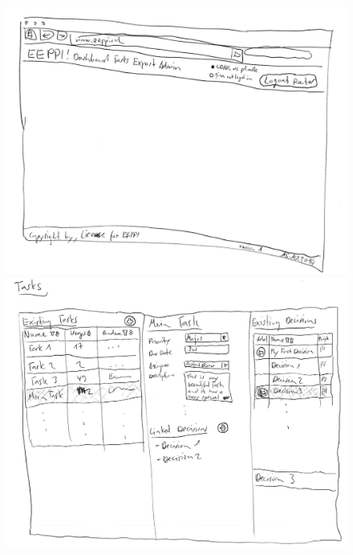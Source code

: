 		\begin{figure}[H]
			\begin{minipage}[b]{0.5\linewidth}
				\includegraphics[width=\linewidth]{interfacesAndProtocols/media/img/wireframesLaurin1.jpg}
			\end{minipage}
			\begin{minipage}[b]{0.5\linewidth}	
				\includegraphics[width=\linewidth]{interfacesAndProtocols/media/img/wireframesLaurin2.jpg}
			\end{minipage}
		\end{figure}
		
